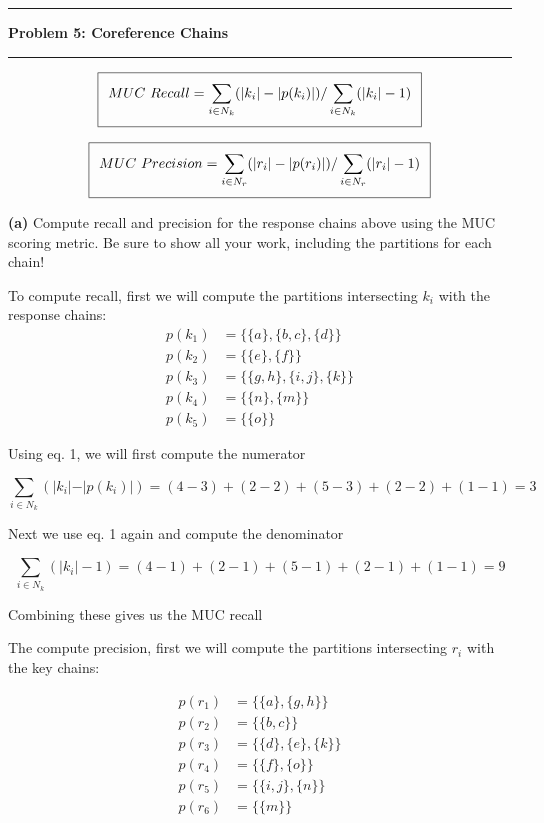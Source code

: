 \documentclass[11pt]{article}
\newcommand\question[2]{\vspace{.25in}\hrule\textbf{#1: #2}\vspace{.5em}\hrule\vspace{.10in}}
\renewcommand\part[1]{\vspace{.10in}\textbf{(#1)}}
\begin{document}
\newpage
\question{Problem 5}{Coreference Chains}

\begin{equation}
\setlength\fboxsep{0.25cm}
\setlength\fboxrule{0.4pt}
\boxed{MUC \ Recall = \sum_{i \in N_k} ( \vert k_i \vert - \vert p(k_i) \vert ) / \sum_{i \in N_k} ( \vert k_i \vert - 1)}
\end{equation}

\begin{equation}
\setlength\fboxsep{0.25cm}
\setlength\fboxrule{0.4pt}
\boxed{MUC \ Precision = \sum_{i \in N_r} ( \vert r_i \vert - \vert p(r_i) \vert ) / \sum_{i \in N_r} ( \vert r_i \vert - 1)}
\end{equation}

\part{a} Compute recall and precision for the response chains above using the MUC scoring metric. Be sure to show all your work, including the partitions for each chain!

To compute recall, first we will compute the partitions intersecting $k_i$ with the response chains:
\begin{align*}
p(k_1) &= \{\{a\},\{b, c\},\{d\}\} \\
p(k_2) &= \{\{e\},\{f\}\} \\
p(k_3) &= \{\{g, h\},\{i, j\},\{k\}\} \\
p(k_4) &= \{\{n\},\{m\}\} \\
p(k_5) &= \{\{o\}\}
\end{align*}

Using eq. 1, we will first compute the numerator

$$\sum_{i \in N_k} ( \vert k_i \vert - \vert p(k_i) \vert ) = (4 - 3) + (2 - 2) + (5 - 3) + (2 - 2) + (1 - 1) = 3$$

Next we use eq. 1 again and compute the denominator

$$\sum_{i \in N_k} ( \vert k_i \vert - 1) = (4 - 1) + (2 - 1) + (5 - 1) + (2 - 1) + (1 - 1) = 9$$

Combining these gives us the MUC recall 

\newline 

The compute precision, first we will compute the partitions intersecting $r_i$ with the key chains:

\begin{align*}
p(r_1) &= \{\{a\},\{g, h\}\} \\
p(r_2) &= \{\{b, c\}\} \\
p(r_3) &= \{\{d\},\{e\},\{k\}\} \\
p(r_4) &= \{\{f\},\{o\}\} \\
p(r_5) &= \{\{i, j\}, \{n\}\} \\
p(r_6) &= \{\{m\}\}
\end{align*}
\end{document}

